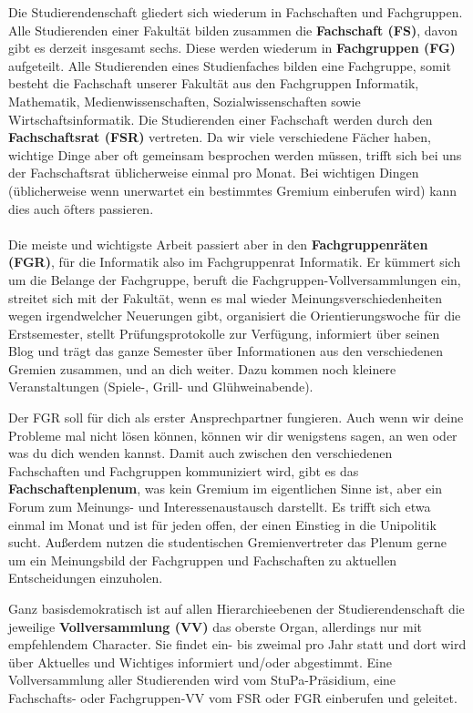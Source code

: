 Die Studierendenschaft gliedert sich wiederum in Fachschaften und Fachgruppen.
Alle Studierenden einer Fakultät bilden zusammen die \textbf{Fachschaft (FS)}, davon gibt es derzeit insgesamt sechs.
Diese werden wiederum in  \textbf{Fachgruppen (FG)} aufgeteilt. Alle Studierenden eines Studienfaches bilden eine Fachgruppe, 
somit besteht die Fachschaft unserer Fakultät aus den Fachgruppen Informatik, Mathematik, Medienwissenschaften, Sozialwissenschaften sowie 
Wirtschaftsinformatik. Die Studierenden einer Fachschaft werden  durch den 
\textbf{Fachschaftsrat (FSR)} vertreten. Da wir viele verschiedene Fächer haben, wichtige Dinge aber oft gemeinsam besprochen werden müssen,
trifft sich bei uns der Fachschaftsrat üblicherweise einmal pro Monat. 
Bei wichtigen Dingen (üblicherweise wenn unerwartet ein bestimmtes Gremium einberufen wird) kann dies auch öfters passieren.
\\
\\
Die meiste und wichtigste Arbeit passiert aber in den \textbf{Fachgruppenräten (FGR)}, für die Informatik also im Fachgruppenrat Informatik. Er kümmert sich um die Belange der Fachgruppe, beruft die Fachgruppen-Vollversammlungen ein, streitet sich mit der
Fakultät, wenn es mal wieder Meinungsverschiedenheiten wegen irgendwelcher Neuerungen gibt, organisiert die Orientierungswoche für die Erstsemester, stellt Prüfungsprotokolle zur Verfügung, informiert über seinen Blog \fginfoUrl und trägt das ganze Semester über Informationen aus den verschiedenen Gremien zusammen, und an dich weiter.
Dazu kommen noch kleinere Veranstaltungen (Spiele-, Grill- und Glühweinabende).

Der FGR soll für dich als erster Ansprechpartner fungieren. Auch wenn wir deine Probleme mal nicht lösen können, können wir dir wenigstens sagen, an wen oder was du dich wenden
kannst. Damit auch zwischen den verschiedenen Fachschaften und Fachgruppen kommuniziert wird, gibt es das \textbf{Fachschaftenplenum}, was kein Gremium im eigentlichen Sinne ist, aber ein Forum zum Meinungs- und Interessenaustausch darstellt. Es trifft sich etwa einmal im Monat und ist für jeden offen, der einen Einstieg in die Unipolitik sucht. Außerdem nutzen die studentischen Gremienvertreter das Plenum gerne um ein Meinungsbild der Fachgruppen und Fachschaften zu aktuellen Entscheidungen einzuholen.

Ganz basisdemokratisch ist auf allen Hierarchie\-ebenen der Studierendenschaft
die jeweilige \textbf{Vollversammlung (VV)} das oberste Organ, allerdings nur
mit empfehlendem Character. Sie findet ein- bis zweimal pro Jahr statt und
dort wird über Aktuelles und Wichtiges informiert und/oder abgestimmt. Eine
Vollversammlung aller Studierenden wird vom StuPa-Präsidium, eine 
Fachschafts- oder Fachgruppen-VV vom FSR oder FGR einberufen und geleitet.

